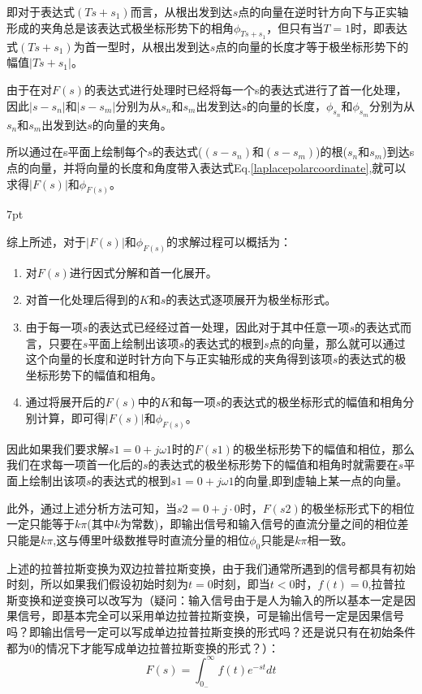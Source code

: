 \documentclass{article}
\numberwithin{equation}{section}
\numberwithin{figure}{section}
\newenvironment{formal}{%
\def\FrameCommand{%
\hspace{1pt}%
{\color{DarkBlue}\vrule width 2pt}%
{\color{formalshade}\vrule width 4pt}%
\colorbox{formalshade}%
}%
\MakeFramed{\advance\hsize-\width\FrameRestore}%
\noindent\hspace{-4.55pt}%
\begin{adjustwidth}{}{7pt}%
\vspace{2pt}\vspace{2pt}%
}
{%
\vspace{2pt}\end{adjustwidth}\endMakeFramed%
}
\begin{document}
即对于表达式$(Ts+s_1)$而言，从根出发到达$s$点的向量在逆时针方向下与正实轴形成的夹角总是该表达式极坐标形势下的相角$\phi_{Ts+s_1}$，但只有当$T=1$时，即表达式$(Ts+s_1)$为首一型时，从根出发到达$s$点的向量的长度才等于极坐标形势下的幅值$|Ts+s_1|$。

由于在对$F(s)$的表达式进行处理时已经将每一个s的表达式进行了首一化处理，因此$|s-s_n|$和$|s-s_m|$分别为从$s_n$和$s_m$出发到达$s$的向量的长度，$\phi_{s_n}$和$\phi_{s_m}$分别为从$s_n$和$s_m$出发到达$s$的向量的夹角。

所以通过在s平面上绘制每个$s$的表达式($(s-s_n)$和$(s-s_m)$)的根($s_n$和$s_m$)到达s点的向量，并将向量的长度和角度带入表达式Eq.\ref{laplacepolarcoordinate},就可以求得$|F(s)|$和$\phi_{F(s)}$。

\begin{formal}
    综上所述，对于$|F(s)|$和$\phi_{F(s)}$的求解过程可以概括为：
\begin{enumerate}
    \item 对$F(s)$进行因式分解和首一化展开。
    \item 对首一化处理后得到的$K$和$s$的表达式逐项展开为极坐标形式。
    \item 由于每一项$s$的表达式已经经过首一处理，因此对于其中任意一项$s$的表达式而言，只要在$s$平面上绘制出该项$s$的表达式的根到$s$点的向量，那么就可以通过这个向量的长度和逆时针方向下与正实轴形成的夹角得到该项$s$的表达式的极坐标形势下的幅值和相角。
    \item 通过将展开后的$F(s)$中的$K$和每一项$s$的表达式的极坐标形式的幅值和相角分别计算，即可得$|F(s)|$和$\phi_{F(s)}$。
\end{enumerate}
\end{formal}

因此如果我们要求解$s1=0+j\omega1$时的$F(s1)$的极坐标形势下的幅值和相位，那么我们在求每一项首一化后的$s$的表达式的极坐标形势下的幅值和相角时就需要在$s$平面上绘制出该项$s$的表达式的根到$s1=0+j\omega1$的向量,即到虚轴上某一点的向量。

此外，通过上述分析方法可知，当$s2=0+j·0$时，$F(s2)$的极坐标形式下的相位一定只能等于$k\pi$(其中$k$为常数)，即输出信号和输入信号的直流分量之间的相位差只能是$k\pi$,这与傅里叶级数推导时直流分量的相位$\phi_0$只能是$k\pi$相一致。

上述的拉普拉斯变换为双边拉普拉斯变换，由于我们通常所遇到的信号都具有初始时刻，所以如果我们假设初始时刻为$t=0$时刻，即当$t<0$时，$f(t)=0$,拉普拉斯变换和逆变换可以改写为（疑问：输入信号由于是人为输入的所以基本一定是因果信号，即基本完全可以采用单边拉普拉斯变换，可是输出信号一定是因果信号吗？即输出信号一定可以写成单边拉普拉斯变换的形式吗？还是说只有在初始条件都为0的情况下才能写成单边拉普拉斯变换的形式？）：
\begin{equation}
        F(s)=\int_{0_-}^{\infty}f(t)e^{-st}dt
\end{equation}
\end{document}
